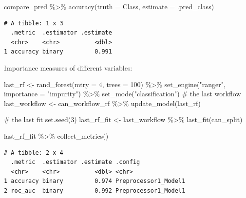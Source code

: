 \documentclass[
  letterpaper,
  DIV=11,
  numbers=noendperiod]{scrreprt}
\newenvironment{Shaded}{\begin{snugshade}}{\end{snugshade}}
\newcommand{\AttributeTok}[1]{\textcolor[rgb]{0.40,0.45,0.13}{#1}}
\newcommand{\CommentTok}[1]{\textcolor[rgb]{0.37,0.37,0.37}{#1}}
\newcommand{\DecValTok}[1]{\textcolor[rgb]{0.68,0.00,0.00}{#1}}
\newcommand{\FunctionTok}[1]{\textcolor[rgb]{0.28,0.35,0.67}{#1}}
\newcommand{\NormalTok}[1]{\textcolor[rgb]{0.00,0.23,0.31}{#1}}
\newcommand{\OtherTok}[1]{\textcolor[rgb]{0.00,0.23,0.31}{#1}}
\newcommand{\SpecialCharTok}[1]{\textcolor[rgb]{0.37,0.37,0.37}{#1}}
\newcommand{\StringTok}[1]{\textcolor[rgb]{0.13,0.47,0.30}{#1}}
\begin{document}
\begin{Shaded}
\begin{Highlighting}[]
\NormalTok{compare\_pred }\SpecialCharTok{\%\textgreater{}\%}  \FunctionTok{accuracy}\NormalTok{(}\AttributeTok{truth =}\NormalTok{ Class, }\AttributeTok{estimate =}\NormalTok{ .pred\_class)}
\end{Highlighting}
\end{Shaded}

\begin{verbatim}
# A tibble: 1 x 3
  .metric  .estimator .estimate
  <chr>    <chr>          <dbl>
1 accuracy binary         0.991
\end{verbatim}

Importance measures of different variables:

\begin{Shaded}
\begin{Highlighting}[]
\NormalTok{last\_rf }\OtherTok{\textless{}{-}} 
  \FunctionTok{rand\_forest}\NormalTok{(}\AttributeTok{mtry =} \DecValTok{4}\NormalTok{, }\AttributeTok{trees =} \DecValTok{100}\NormalTok{) }\SpecialCharTok{\%\textgreater{}\%} 
  \FunctionTok{set\_engine}\NormalTok{(}\StringTok{"ranger"}\NormalTok{,  }\AttributeTok{importance =} \StringTok{"impurity"}\NormalTok{) }\SpecialCharTok{\%\textgreater{}\%} 
  \FunctionTok{set\_mode}\NormalTok{(}\StringTok{"classification"}\NormalTok{)}
\CommentTok{\# the last workflow}
\NormalTok{last\_workflow }\OtherTok{\textless{}{-}} 
\NormalTok{  can\_workflow\_rf }\SpecialCharTok{\%\textgreater{}\%} 
  \FunctionTok{update\_model}\NormalTok{(last\_rf)}

\CommentTok{\# the last fit}
\FunctionTok{set.seed}\NormalTok{(}\DecValTok{3}\NormalTok{)}
\NormalTok{last\_rf\_fit }\OtherTok{\textless{}{-}} 
\NormalTok{  last\_workflow }\SpecialCharTok{\%\textgreater{}\%} 
  \FunctionTok{last\_fit}\NormalTok{(can\_split)}
\end{Highlighting}
\end{Shaded}

\begin{Shaded}
\begin{Highlighting}[]
\NormalTok{last\_rf\_fit }\SpecialCharTok{\%\textgreater{}\%} 
  \FunctionTok{collect\_metrics}\NormalTok{()}
\end{Highlighting}
\end{Shaded}

\begin{verbatim}
# A tibble: 2 x 4
  .metric  .estimator .estimate .config             
  <chr>    <chr>          <dbl> <chr>               
1 accuracy binary         0.974 Preprocessor1_Model1
2 roc_auc  binary         0.992 Preprocessor1_Model1
\end{verbatim}
\end{document}
